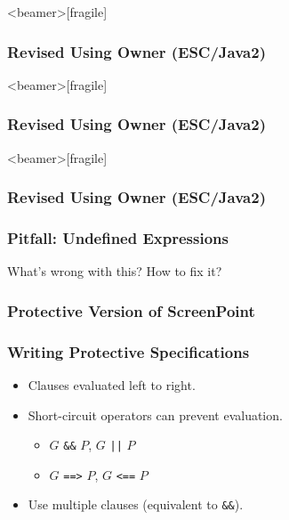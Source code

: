 \begin{frame}<beamer>[fragile]
\frametitle{Revised Using Owner (ESC/Java2)}


\end{frame}

\begin{frame}<beamer>[fragile]
\frametitle{Revised Using Owner (ESC/Java2)}


\end{frame}

\begin{frame}<beamer>[fragile]
\frametitle{Revised Using Owner (ESC/Java2)}


\end{frame}

\begin{frame}
\frametitle{Pitfall: Undefined Expressions}
\begin{question}
What's wrong with this? How to fix it?

\rm

\end{question}
\end{frame}

\begin{frame}
\frametitle{Protective Version of ScreenPoint}

\end{frame}

\begin{frame}[fragile]
\frametitle{Writing Protective Specifications}

\begin{itemize}
\item
Clauses evaluated left to right.

\item
Short-circuit operators can prevent evaluation.
\begin{itemize}
\item
$G$ \lstinline!&&! $P$, $G$ \lstinline!||! $P$

\item
$G$ \lstinline!==>! $P$, $G$ \lstinline!<==! $P$
\end{itemize}

\item
Use multiple clauses (equivalent to \lstinline!&&!).
\end{itemize}
\end{frame}


